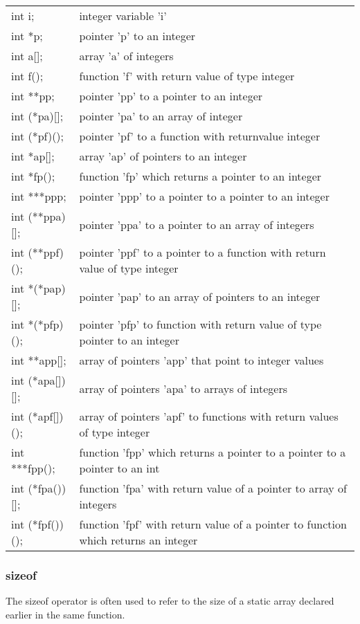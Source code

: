 \begin{tabular}{p{2.0cm} p{6.0cm}}
	int i;         & integer variable 'i'\\
	int *p;        & pointer 'p' to an integer\\
	int a[];       & array 'a' of integers\\
	int f();       & function 'f' with return value of type integer\\
	int **pp;      & pointer 'pp' to a pointer to an integer\\
	int (*pa)[];   & pointer 'pa' to an array of integer\\
	int (*pf)();   & pointer 'pf' to a function with returnvalue integer\\
	int *ap[];     & array 'ap' of pointers to an integer\\
	int *fp();     & function 'fp' which returns a pointer to an integer\\
	int ***ppp;    & pointer 'ppp' to a pointer to a pointer to an integer\\
	int (**ppa)[]; & pointer 'ppa' to a pointer to an array of integers\\
	int (**ppf)(); & pointer 'ppf' to a pointer to a function with return value of type integer\\
	int *(*pap)[]; & pointer 'pap' to an array of pointers to an integer\\
	int *(*pfp)(); & pointer 'pfp' to function with return value of type pointer to an integer\\
	int **app[];   & array of pointers 'app' that point to integer values\\
	int (*apa[])[];& array of pointers 'apa' to arrays of integers\\
	int (*apf[])();& array of pointers 'apf' to functions with return values of type integer\\
	int ***fpp();  & function 'fpp' which returns a pointer to a pointer to a pointer to an int\\
	int (*fpa())[];& function 'fpa' with return value of a pointer to array of integers\\
	int (*fpf())();& function 'fpf' with return value of a pointer to function which returns an integer
\end{tabular}

\subsubsection{sizeof}
The sizeof operator is often used to refer to the size of a static array
declared earlier in the same function.

